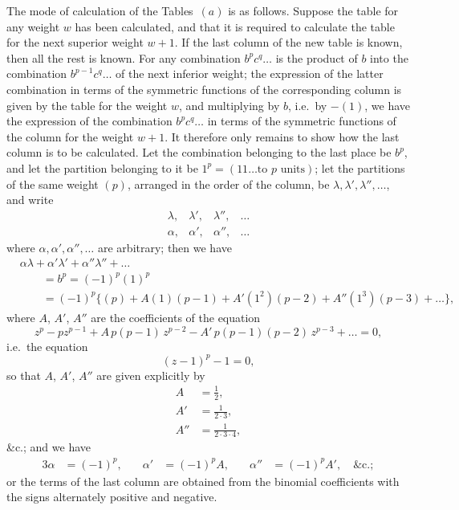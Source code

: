 \documentclass[11pt,a4paper]{article}
\begin{document}
The mode of calculation of the Tables~$(a)$ is as follows. Suppose the table
for any weight $w$ has been calculated, and that it is required to calculate
the table for the next superior weight $w + 1$. If the last column of the new
table is known, then all the rest is known. For any combination
$b^p c^q \ldots$ is the product of $b$ into the combination $b^{p-1} c^q \ldots$
of the next inferior weight; the expression of the latter combination in terms
of the symmetric functions of the corresponding column is given by the table
for the weight $w$, and multiplying by $b$, i.e.\ by $-(1)$, we have the
expression of the combination $b^p c^q \ldots$ in terms of the symmetric
functions of the column for the weight $w + 1$. It therefore only remains to
show how the last column is to be calculated. Let the combination belonging to
the last place be $b^p$, and let the partition belonging to it be
$1^p = (11 \ldots \text{to } p \text{ units})$; let the partitions of the same
weight $(p)$, arranged in the order of the column, be
$\lambda, \lambda', \lambda'', \ldots$, and write
\[\begin{array}{ccccc}
\lambda, & \lambda', & \lambda'', & \ldots \\
\alpha, & \alpha', & \alpha'', & \ldots
\end{array}\]
where $\alpha, \alpha', \alpha'', \ldots$ are arbitrary; then we have
\begin{align*}
& \alpha\lambda + \alpha'\lambda' + \alpha''\lambda'' + \ldots \\
&\qquad = b^p = (-1)^p (1)^p \\
&\qquad = (-1)^p \{(p) + A(1)(p-1) + A'(1^2)(p-2) + A''(1^3)(p-3) + \ldots\},
\end{align*}
where $A$, $A'$, $A''$ are the coefficients of the equation
\[
z^p - pz^{p-1} + A\, p(p-1)\, z^{p-2} - A'\, p(p-1)(p-2)\, z^{p-3} + \ldots = 0,
\]
i.e.\ the equation
\[
(z - 1)^p - 1 = 0,
\]
so that $A$, $A'$, $A''$ are given explicitly by
\begin{align*}
A &= \frac{1}{2}, \\
A' &= \frac{1}{2\cdot 3}, \\
A'' &= \frac{1}{2\cdot 3\cdot 4},
\end{align*}
\&c.; and we have
\begin{alignat*}{3}
\alpha &= (-1)^p, &\quad \alpha' &= (-1)^p A, &\quad \alpha'' &= (-1)^p A', \quad \&\text{c.};
\end{alignat*}
or the terms of the last column are obtained from the binomial coefficients
with the signs alternately positive and negative.
\end{document}
